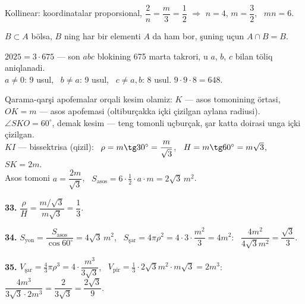 Kollinear: koordinatalar proporsional, $\dfrac2n=\dfrac m3=\dfrac12$ $\Rightarrow$ $n=4$, $m=\dfrac32$, \ $mn=6$.

$B\subset A$ bölsa, $B$ ning har bir elementi $A$ da ham bor, şuning uçun $A\cap B=B$.

$2025=3\cdot675$ — son $abc$ blokining 675 marta takrori, u $a$, $b$, $c$ bilan töliq aniqlanadi.\\
$a\ne0$: 9 usul, \ $b\ne a$: 9 usul, \ $c\ne a,b$: 8 usul. \quad $9\cdot9\cdot8=648$.

\newpage
{}
Qarama-qarşi apofemalar orqali kesim olamiz: $K$ — asos tomonining örtasi, $OK=m$ — asos apofemasi (oltiburçakka içki çizilgan aylana radiusi). $\angle SKO=60^\circ$, demak kesim — teng tomonli uçburçak, şar katta doirasi unga içki çizilgan.\\
$KI$ — bissektrisa (\textcolor{aux}{qizil}): \ $\rho=m\tg30^\circ=\dfrac m{\sqrt3}$, \ $H=m\tg60^\circ=m\sqrt3$, \ $SK=2m$.\\
Asos tomoni $a=\dfrac{2m}{\sqrt3}$, \ $S_{\text{asos}}=6\cdot\frac12\cdot a\cdot m=2\sqrt3\,m^2$.

\textbf{33.} $\dfrac\rho H=\dfrac{m/\sqrt3}{m\sqrt3}=\dfrac13$.

\textbf{34.} $S_{\text{yon}}=\dfrac{S_{\text{asos}}}{\cos60^\circ}=4\sqrt3\,m^2$, \ $S_{\text{şar}}=4\pi\rho^2=4\cdot3\cdot\dfrac{m^2}3=4m^2$: \ $\dfrac{4m^2}{4\sqrt3m^2}=\dfrac{\sqrt3}3$.

\textbf{35.} $V_{\text{şar}}=\frac43\pi\rho^3=4\cdot\dfrac{m^3}{3\sqrt3}$, \ $V_{\text{pir}}=\frac13\cdot2\sqrt3m^2\cdot m\sqrt3=2m^3$: \ $\dfrac{4m^3}{3\sqrt3\cdot2m^3}=\dfrac2{3\sqrt3}=\dfrac{2\sqrt3}9$.

